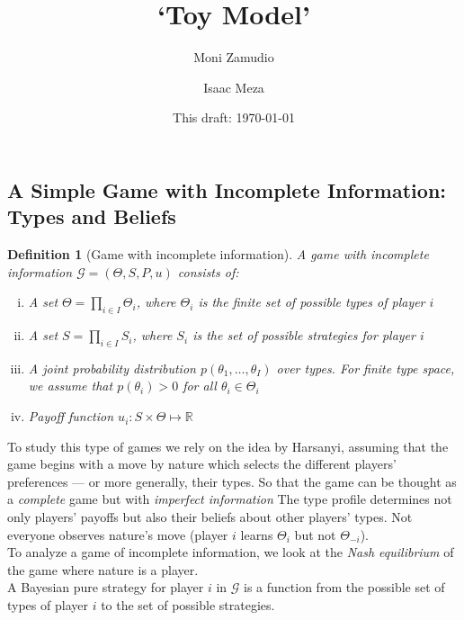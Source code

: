 \documentclass[10pt]{article}
\newtheorem{dfn}{Definition}
\begin{document}
\title{`Toy Model'}

\author{ Moni Zamudio \and Isaac Meza}
\date{This draft: \today \\[2 cm] }

\maketitle


\subsection*{A Simple Game with Incomplete Information: Types and Beliefs}

\begin{dfn}[Game with incomplete information] A game with incomplete information $\mathcal{G}=(\Theta, S, P, u)$ consists of:
\begin{enumerate}[(i)]
\item A set $\Theta=\prod_{i\in I}\Theta_i$, where $\Theta_i$ is the finite set of possible types of player $i$ 
\item A set $S=\prod_{i\in I} S_i$, where $S_i$ is the set of possible strategies for player $i$
\item A joint probability distribution $p(\theta_1,\ldots, \theta_I)$ over types. For finite type space, we assume that $p(\theta_i)>0$ for all $\theta_i\in \Theta_i$
\item Payoff function $u_i:S\times \Theta\longmapsto \mathbb{R}$
\end{enumerate}
\end{dfn}

To study this type of games we rely on the idea by Harsanyi, assuming that the game begins with a move by nature which selects the different players’ preferences — or more generally, their types. So that the game can be thought as a \emph{complete} game but with \emph{imperfect information}
The type profile determines not only players’ payoffs but also their beliefs about other players’ types. Not everyone observes nature's move (player $i$ learns $\Theta_i$ but not $\Theta_{-i}$).\\

To analyze a game of incomplete information, we look at the \emph{Nash equilibrium} of the game where nature is a player. \\

A Bayesian pure strategy for player $i$ in $\mathcal{G}$ is a function from the possible set of types of player $i$ to the set of possible strategies.\\
\end{document}
